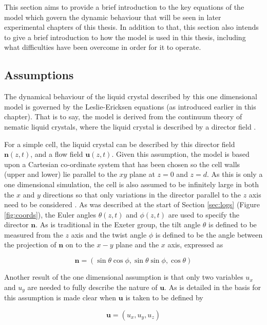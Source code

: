 This section aims to provide a brief introduction to the key equations of the model which govern the dynamic behaviour that will be seen in later experimental chapters of this thesis. In addition to that, this section also intends to give a brief introduction to how the model is used in this thesis, including what difficulties have been overcome in order for it to operate.
 
\subsection{Assumptions}
The dynamical behaviour of the liquid crystal described by this one dimensional model is governed by the Leslie-Ericksen equations (as introduced earlier in this chapter). That is to say, the model is derived from the continuum theory of nematic liquid crystals, where the liquid crystal is described by a director field \cite{Cornford2008}.

For a simple cell, the liquid crystal can be described by this director field $\mathbf{n}\left(z,t\right)$, and a flow field $\mathbf{u}\left(z,t\right)$. Given this assumption, the model is based upon a Cartesian co-ordinate system that has been chosen so the cell walls (upper and lower) lie parallel to the $xy$ plane at $z=0$ and $z=d$. As this is only a one dimensional simulation, the cell is also assumed to be infinitely large in both the $x$ and $y$ directions so that only variations in the director parallel to the $z$ axis need to be considered \cite{Cornford2008}. As was described at the start of Section \ref{sec:logs} (Figure \ref{fig:coords}), the Euler angles $\theta\left(z,t\right)$ and $\phi\left(z,t\right)$ are used to specify the director $\mathbf{n}$. As is traditional in the Exeter group, the tilt angle $\theta$ is defined to be measured from the $z$ axis and the twist angle $\phi$ is defined to be the angle between the projection of $\mathbf{n}$ on to the $x-y$ plane and the $x$ axis, expressed as

\begin{equation}
\mathbf{n}=\left(\sin\theta\cos\phi,\sin\theta\sin\phi,\cos\theta\right)
\end{equation}

Another result of the one dimensional assumption is that only two variables $u_x$ and $u_y$ are needed to fully describe the nature of $\mathbf{u}$. As is detailed in \cite{Cornford2008} the basis for this assumption is made clear when $\mathbf{u}$ is taken to be defined by

\begin{equation}
\mathbf{u}=\left(u_x,u_y,u_z\right)
\end{equation}


